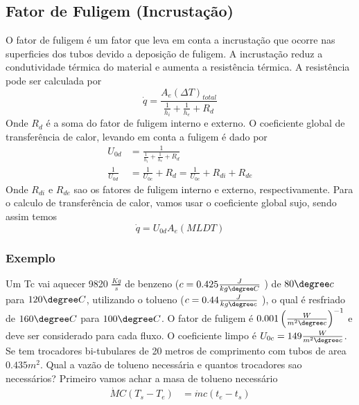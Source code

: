 \subsection{Fator de Fuligem (Incrustação)}
O fator de fuligem é um fator que leva em conta a incrustação que ocorre nas superficies dos tubos
devido a deposição de fuligem. A incrustação reduz a condutividade térmica do material e aumenta a
resistência térmica. A resistência pode ser calculada por
\begin{equation}
    \dot{q} = \frac{A_{e} (\Delta T)_{total}}{\frac{1}{h_{i} } + \frac{1}{h_{e} } + R_{d} }
\end{equation}
Onde \(R_{d}\) é a soma do fator de fuligem interno e externo. O coeficiente global de transferência
de calor, levando em conta a fuligem é dado por
\begin{align}
    U_{0d} &= \frac{1}{\frac{1}{h_{i} } + \frac{1}{h_{e} } + R_{d} }\\
    \frac{1}{U_{0d} } &= \frac{1}{U_{0c} } + R_{d} = \frac{1}{U_{0c} } + R_{di} + R_{de}
\end{align}
Onde \(R_{di}\) e \(R_{de}\) sao os fatores de fuligem interno e externo, respectivamente. Para o
calculo de transferência de calor, vamos usar o coeficiente global sujo, sendo assim temos
\begin{equation}
    \dot{q} = U_{0d} A_{e} (MLDT)
\end{equation}
\subsubsection{Exemplo}
Um Tc vai aquecer 9820 \(\frac{Kg}{s}\) de benzeno (\(c = 0.425 \frac{J}{kg \degree  C}\) ) de \(80 \degree c\)
para \( 120 \degree C \), utilizando o tolueno (\(c = 0.44 \frac{J}{kg\degree c}\) ), o qual é
resfriado de \(160 \degree  C\) para \(100 \degree C\). O fator de fuligem é
\(0.001 \left( \frac{W}{m^{2} \degree c} \right)^{-1}  \) e deve ser considerado para cada fluxo. O 
coeficiente limpo é \(U_{0c} = 149 \frac{W}{m^{2} \degree c} \). Se tem trocadores bi-tubulares de 
20 metros de comprimento com tubos de area \(0.435 m^{2} \). Qual a vazão de tolueno necessária e 
quantos trocadores sao necessários?
Primeiro vamos achar a masa de tolueno necessário
\begin{align}
    \dot{M}C(T_{s} - T_{e} ) &= \dot{m}c(t_{e} - t_{s} )
\end{align}   
   


